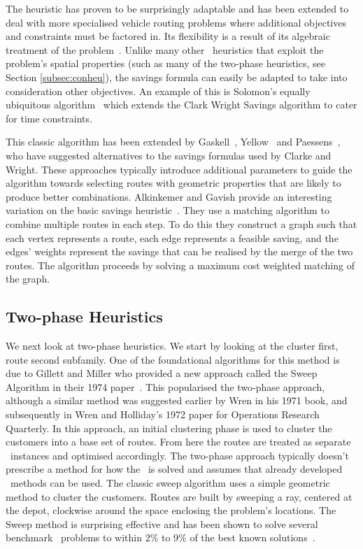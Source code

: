The heuristic has proven to be surprisingly adaptable and has been extended to deal with more specialised vehicle routing problems where additional objectives and constraints must be factored in. Its flexibility is a result of its algebraic treatment of the problem~\cite{Laporte:1999}. Unlike many other \VRP\ heuristics that exploit the problem's spatial properties (such as many of the two-phase heuristics, see Section \ref{subsec:conheu}), the savings formula can easily be adapted to take into consideration other objectives. An example of this is Solomon's equally ubiquitous algorithm~\cite{Solomon:1987} which extends the Clark Wright Savings algorithm to cater for time constraints. 

This classic algorithm has been extended by Gaskell~\cite{Gaskell:1967}, Yellow~\cite{Yellow:1970} and Paessens~\cite{Paessens:1988}, who have suggested alternatives to the savings formulas used by Clarke and Wright. These approaches typically introduce additional parameters to guide the algorithm towards selecting routes with geometric properties that are likely to produce better combinations. Alkinkemer and Gavish provide an interesting variation on the basic savings heuristic~\cite{AG:1991}. They use a matching algorithm to combine multiple routes in each step. To do this they construct a graph such that each vertex represents a route, each edge represents a feasible saving, and the edges' weights represent the savings that can be realised by the merge of the two routes. The algorithm proceeds by solving a maximum cost weighted matching of the graph.

\subsection{Two-phase Heuristics}
\label{sec:tph}

We next look at two-phase heuristics. We start by looking at the cluster first, route second subfamily. One of the foundational algorithms for this method is due to Gillett and Miller who provided a new approach called the Sweep Algorithm in their 1974 paper~\cite{GM:1974}. This popularised the two-phase approach, although a similar method was suggested earlier by Wren in his 1971 book, and subsequently in Wren and Holliday's 1972 paper for Operations Research Quarterly. In this approach, an initial clustering phase is used to cluster the customers into a base set of routes. From here the routes are treated as separate \TSP\ instances and optimised accordingly. The two-phase approach typically doesn't prescribe a method for how the \TSP\ is solved and assumes that already developed \TSP\ methods can be used. The classic sweep algorithm uses a simple geometric method to cluster the customers. Routes are built by sweeping a ray, centered at the depot, clockwise around the space enclosing the problem's locations. The Sweep method is surprising effective and has been shown to solve several benchmark \VRP\ problems to within 2\% to 9\% of the best known solutions~\cite{TV2001}.

